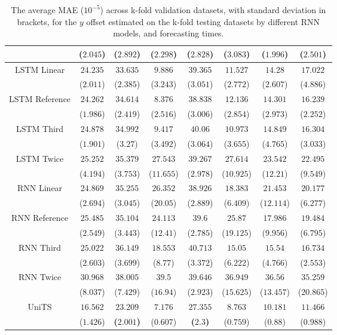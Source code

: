 \begin{table}[!ht]
{\begin{tabular}{|c|c|c|c|c|c|c|c|}
			 & ($2.045$) & ($2.892$) & ($2.298$) & ($2.828$) & ($3.083$) & ($1.996$) & ($2.501$) \\ \hline
			\multirow{2}{*}{LSTM Linear} & $24.235$ & $33.635$ & $9.886$ & $39.365$ & $11.527$ & $14.28$ & $17.022$ \\
			 & ($2.011$) & ($2.385$) & ($3.243$) & ($3.051$) & ($2.772$) & ($2.607$) & ($4.886$) \\ \hline
			\multirow{2}{*}{LSTM Reference} & $24.262$ & $34.614$ & $8.376$ & $38.838$ & $12.136$ & $14.301$ & $16.239$ \\
			 & ($1.986$) & ($2.419$) & ($2.516$) & ($3.006$) & ($2.854$) & ($2.973$) & ($2.252$) \\ \hline
			\multirow{2}{*}{LSTM Third} & $24.878$ & $34.992$ & $9.417$ & $40.06$ & $10.973$ & $14.849$ & $16.304$ \\
			 & ($1.901$) & ($3.27$) & ($3.492$) & ($3.064$) & ($3.655$) & ($4.765$) & ($3.033$) \\ \hline
			\multirow{2}{*}{LSTM Twice} & $25.252$ & $35.379$ & $27.543$ & $39.267$ & $27.614$ & $23.542$ & $22.495$ \\
			 & ($4.194$) & ($3.753$) & ($11.655$) & ($2.978$) & ($10.925$) & ($12.21$) & ($9.549$) \\ \hline
			\multirow{2}{*}{RNN Linear} & $24.869$ & $35.255$ & $26.352$ & $38.926$ & $18.383$ & $21.453$ & $20.177$ \\
			 & ($2.694$) & ($3.045$) & ($20.05$) & ($2.889$) & ($6.409$) & ($12.114$) & ($6.277$) \\ \hline
			\multirow{2}{*}{RNN Reference} & $25.485$ & $35.104$ & $24.113$ & $39.6$ & $25.87$ & $17.986$ & $19.484$ \\
			 & ($2.549$) & ($3.443$) & ($12.41$) & ($2.785$) & ($19.125$) & ($9.956$) & ($6.795$) \\ \hline
			\multirow{2}{*}{RNN Third} & $25.022$ & $36.149$ & $18.553$ & $40.713$ & $15.05$ & $15.54$ & $16.734$ \\
			 & ($2.603$) & ($3.699$) & ($8.77$) & ($3.372$) & ($6.222$) & ($4.766$) & ($2.553$) \\ \hline
			\multirow{2}{*}{RNN Twice} & $30.968$ & $38.005$ & $39.5$ & $39.646$ & $36.949$ & $36.56$ & $35.259$ \\
			 & ($8.037$) & ($7.429$) & ($16.94$) & ($2.923$) & ($15.625$) & ($13.457$) & ($20.865$) \\ \hline
			\multirow{2}{*}{UniTS} & $16.562$ & $\mathbf{23.209}$ & $7.176$ & $\mathbf{27.355}$ & $8.763$ & $10.181$ & $11.466$ \\
			 & ($1.426$) & \textbf{(}$\mathbf{2.001}$\textbf{)} & ($0.607$) & \textbf{(}$\mathbf{2.3}$\textbf{)} & ($0.759$) & ($0.88$) & ($0.988$) \\ \hline
		\end{tabular}
	}
	\caption{The average MAE ($10^{-5}$) across k-fold validation datasets, with standard deviation in brackets, for the $y$ offset estimated on the k-fold testing datasets by different RNN models, and forecasting times.}
	\label{tab:all_latitude_no_abs_MAE}
\end{table}

